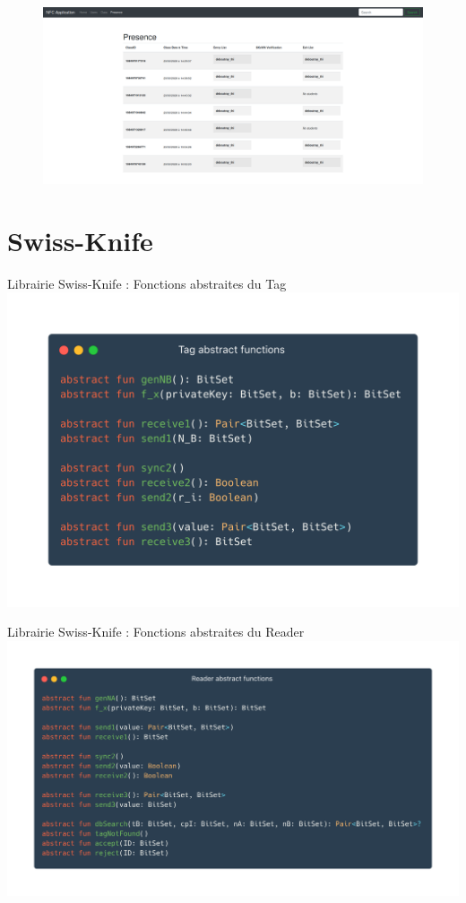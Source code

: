 \documentclass[aspectratio=169]{beamer}
\begin{document}
\begin{frame}
  \begin{figure}
    \centering
    \includegraphics[height=.9\textheight]{../assets/capture_page_presence.png}
  \end{figure}
\end{frame}

\section{Swiss-Knife}

\begin{frame}{Librairie Swiss-Knife : Fonctions abstraites du Tag}
  \centering
  \includegraphics[height=\textheight]{../assets/tagAbs}
\end{frame}

\begin{frame}{Librairie Swiss-Knife : Fonctions abstraites du Reader}
  \centering
  \includegraphics[height=\textheight]{../assets/readerAbs}
\end{frame}
\end{document}
